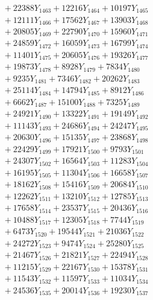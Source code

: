 \documentclass[a4paper,10pt]{article}
\begin{document}
{\begin{align}
&\;  + 22388 Y_{1463} + 12216 Y_{1464} + 10197 Y_{1465} \\[0.3ex]
&\;  + 12111 Y_{1466} + 17562 Y_{1467} + 13903 Y_{1468} \\[0.5ex]\allowbreak
&\;  + 20805 Y_{1469} + 22790 Y_{1470} + 15960 Y_{1471} \\[0.3ex]
&\;  + 24859 Y_{1472} + 16059 Y_{1473} + 16799 Y_{1474} \\[0.3ex]
&\;  + 11401 Y_{1475} + 20605 Y_{1476} + 19326 Y_{1477} \\[0.3ex]
&\;  + 19873 Y_{1478} + 8928 Y_{1479} + 7834 Y_{1480} \\[0.3ex]
&\;  + 9235 Y_{1481} + 7346 Y_{1482} + 20262 Y_{1483} \\[0.3ex]
&\;  + 25114 Y_{1484} + 14794 Y_{1485} + 8912 Y_{1486} \\[0.3ex]
&\;  + 6662 Y_{1487} + 15100 Y_{1488} + 7325 Y_{1489} \\[0.3ex]
&\;  + 24921 Y_{1490} + 13322 Y_{1491} + 19149 Y_{1492} \\[0.3ex]
&\;  + 11143 Y_{1493} + 24686 Y_{1494} + 24247 Y_{1495} \\[0.3ex]
&\;  + 20630 Y_{1496} + 15135 Y_{1497} + 23868 Y_{1498} \\[0.5ex]\allowbreak
&\;  + 22429 Y_{1499} + 17921 Y_{1500} + 9793 Y_{1501} \\[0.3ex]
&\;  + 24307 Y_{1502} + 16564 Y_{1503} + 11283 Y_{1504} \\[0.3ex]
&\;  + 16195 Y_{1505} + 11304 Y_{1506} + 16658 Y_{1507} \\[0.3ex]
&\;  + 18162 Y_{1508} + 15416 Y_{1509} + 20684 Y_{1510} \\[0.3ex]
&\;  + 12262 Y_{1511} + 13210 Y_{1512} + 12785 Y_{1513} \\[0.3ex]
&\;  + 17658 Y_{1514} + 23537 Y_{1515} + 20436 Y_{1516} \\[0.3ex]
&\;  + 10488 Y_{1517} + 12305 Y_{1518} + 7744 Y_{1519} \\[0.3ex]
&\;  + 6473 Y_{1520} + 19544 Y_{1521} + 21036 Y_{1522} \\[0.3ex]
&\;  + 24272 Y_{1523} + 9474 Y_{1524} + 25280 Y_{1525} \\[0.3ex]
&\;  + 21467 Y_{1526} + 21821 Y_{1527} + 22494 Y_{1528} \\[0.5ex]\allowbreak
&\;  + 11215 Y_{1529} + 22167 Y_{1530} + 15378 Y_{1531} \\[0.3ex]
&\;  + 11543 Y_{1532} + 11597 Y_{1533} + 11034 Y_{1534} \\[0.3ex]
&\;  + 24536 Y_{1535} + 20014 Y_{1536} + 19230 Y_{1537} \\[0.3ex]

\end{align}}
\end{document}
